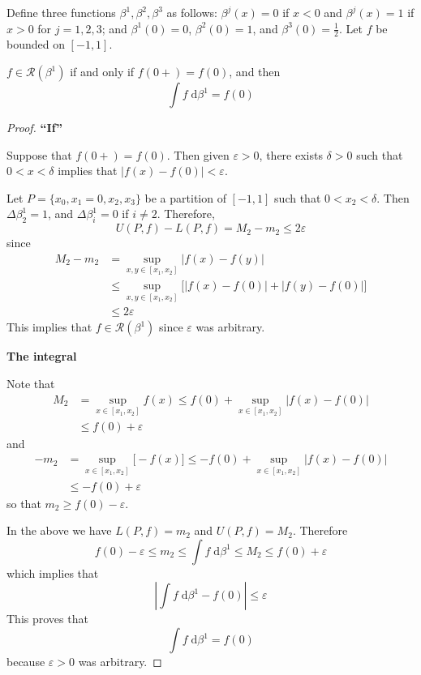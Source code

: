\documentclass{homework}
\begin{document}
	
	Define three functions $\beta^1,\beta^2, \beta^3$ as follows: $\beta^j(x) = 0$ if $x < 0$ and $\beta^j(x) = 1$ if $x > 0$ for $j=1,2,3$; and $\beta^1(0) = 0$, $\beta^2(0) = 1$, and $\beta^3(0)=\frac{1}{2}$. Let $f$ be bounded on $[-1, 1]$.
	
	\begin{alphaparts}
		\questionpart %
		
		$f \in \mathscr{R}(\beta^1)$ if and only if $f(0+) = f(0)$, and then
		$$
		\int f\;\text{d}\beta^1 = f(0)
		$$
		
		\begin{proof}
			
			\textbf{``If''}
			
			Suppose that $f(0+) = f(0)$. Then given $\varepsilon > 0$, there exists $\delta > 0$ such that $0 < x < \delta$ implies that $|f(x) - f(0)| < \varepsilon$.
			
			Let $P = \{x_0, x_1=0, x_2, x_3\}$ be a partition of $[-1, 1]$ such that $0 < x_2 < \delta$. Then $\Delta \beta^1_2 = 1$, and $\Delta \beta^1_i = 0$ if $i \ne 2$. Therefore,
			$$
			U(P, f) - L(P, f) = M_2 - m_2 \le 2\varepsilon
			$$
			since 
			$$
			\begin{aligned}
				M_2 - m_2 &= \sup_{x,y\in[x_1, x_2]} |f(x) - f(y)|\\
				&\le \sup_{x,y\in[x_1,x_2]}\Big[|f(x) - f(0)| + |f(y) - f(0)|\Big]\\
				&\le 2\varepsilon
			\end{aligned}
			$$
			This implies that $f \in \mathscr{R}(\beta^1)$ since $\varepsilon$ was arbitrary.
			
			\textbf{The integral}
			
			Note that
			$$
			\begin{aligned}
				M_2 &= \sup_{x\in[x_1, x_2]}f(x) \le f(0) + \sup_{x \in[x_1,x_2]}|f(x) - f(0)|\\
				&\le f(0) + \varepsilon
			\end{aligned}
			$$
			and
			$$
			\begin{aligned}
				-m_2 &= \sup_{x\in[x_1, x_2]}\Big[-f(x)\Big] \le -f(0) + \sup_{x\in[x_1,x_2]}|f(x) - f(0)| \\
				&\le -f(0) + \varepsilon
			\end{aligned}
			$$
			so that $m_2 \ge f(0) - \varepsilon$.
			
			In the above we have $L(P,f) = m_2$ and $U(P, f) = M_2$. Therefore
			$$
			f(0) - \varepsilon \le m_2 \le \int f\;\text{d}\beta^1 \le M_2 \le f(0) + \varepsilon
			$$
			which implies that
			$$
			\left|\int f \;\text{d}\beta^1 - f(0)\right| \le \varepsilon
			$$
			This proves that
			$$
			\int f\;\text{d}\beta^1 = f(0)
			$$
			because $\varepsilon>0$ was arbitrary.
			

\end{proof}
\end{alphaparts}
\end{document}
